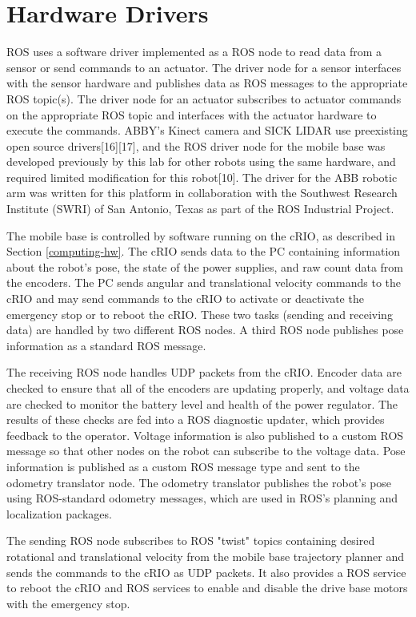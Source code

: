 \documentclass[]{cwru} %
\begin{document}
\section{Hardware Drivers}
\label{hardware-drivers}

ROS uses a
software driver implemented as a ROS node to read data from a sensor or
send commands to an actuator. The driver node for a sensor interfaces
with the sensor hardware and publishes data as ROS messages to the
appropriate ROS topic(s). The driver node for an actuator subscribes to
actuator commands on the appropriate ROS topic and interfaces with the
actuator hardware to execute the commands. ABBY's Kinect camera and SICK
LIDAR use preexisting open source drivers{[}16{]}{[}17{]}, and the ROS
driver node for the mobile base was developed previously by this lab for
other robots using the same hardware, and required limited modification
for this robot{[}10{]}. The driver for the ABB robotic arm was written
for this platform in collaboration with the Southwest Research Institute
(SWRI) of San Antonio, Texas as part of the ROS Industrial Project.

The mobile
base is controlled by software running on the cRIO, as described in Section
\ref{computing-hw}. The cRIO sends data to the PC containing information
about the robot's pose, the state of the power supplies, and raw count
data from the encoders. The PC sends angular and translational velocity
commands to the cRIO and may send commands to the cRIO to activate or
deactivate the emergency stop or to reboot the cRIO. These two tasks
(sending and receiving data) are handled by two different ROS nodes. A
third ROS node publishes pose information as a standard ROS message.

The receiving ROS node handles UDP packets from the cRIO. Encoder data
are checked to ensure that all of the encoders are updating properly,
and voltage data are checked to monitor the battery level and health of
the power regulator. The results of these checks are fed into a ROS
diagnostic updater, which provides feedback to the operator. Voltage
information is also published to a custom ROS message so that other
nodes on the robot can subscribe to the voltage data. Pose information
is published as a custom ROS message type and sent to the odometry
translator node. The odometry translator publishes the robot's pose
using ROS-standard odometry messages, which are used in ROS's planning
and localization packages.

The sending ROS node subscribes to ROS "twist" topics containing desired
rotational and translational velocity from the mobile base trajectory
planner and sends the commands to the cRIO as UDP packets. It also
provides a ROS service to reboot the cRIO and ROS services to enable and
disable the drive base motors with the emergency stop.
\end{document}
